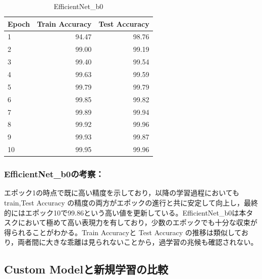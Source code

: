\documentclass[a4paper,11pt,titlepage]{jsarticle}
\begin{document}
\begin{table}[H]
\centering
\caption{EfficientNet\_b0}
\label{tab:efficientnet}
\begin{tabular}{lrr}
\hline
 Epoch &  Train Accuracy &  Test Accuracy \\
\hline
     1 &           94.47 &                98.76 \\
     2 &           99.00 &                99.19 \\
     3 &           99.40 &                99.54 \\
     4 &           99.63 &                99.59 \\
     5 &           99.79 &                99.79 \\
     6 &           99.85 &                99.82 \\
     7 &           99.89 &                99.94 \\
     8 &           99.92 &                99.96 \\
     9 &           99.93 &                99.87 \\
    10 &           99.95 &                99.96 \\
\hline
\end{tabular}
\end{table}


\subsubsection*{EfficientNet\_b0の考察：}
エポック1の時点で既に高い精度を示しており，以降の学習過程においてもtrain,Test Accuracy の精度の両方がエポックの進行と共に安定して向上し，最終的にはエポック10で99.86という高い値を更新している。EfficientNet\_b0は本タスクにおいて極めて高い表現力を有しており，少数のエポックでも十分な収束が得られることがわかる。Train Accuracyと Test Accuracy の推移は類似しており，両者間に大きな乖離は見られないことから，過学習の兆候も確認されない。


\subsection{Custom Modelと新規学習の比較}


  
\end{document}
